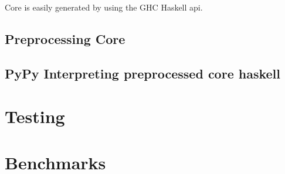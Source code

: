 \documentclass{article}
\begin{document}
Core is easily generated by using the GHC Haskell api.

\subsection{Preprocessing Core}


\subsection{PyPy Interpreting preprocessed core haskell}


\section{Testing}


\section{Benchmarks}





\end{document}
